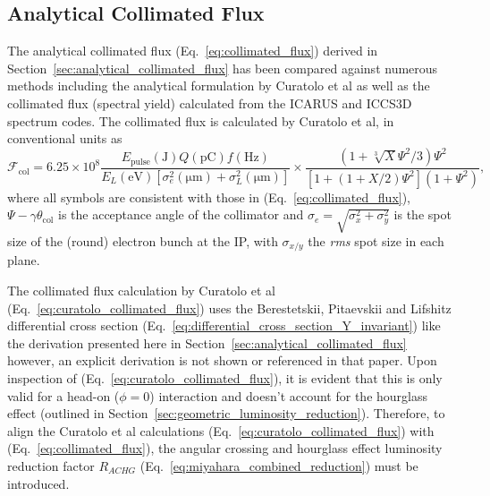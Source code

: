 \documentclass[../main.tex]{subfiles}
\begin{document}
\subsection{Analytical Collimated Flux}
\label{sec:analytical_collimated_flux_benchmarking}

The analytical collimated flux (Eq.~\ref{eq:collimated_flux}) derived in Section~\ref{sec:analytical_collimated_flux} has been compared against numerous methods including the analytical formulation by Curatolo et al \cite{curatolo2017analytical} as well as the collimated flux (spectral yield) calculated from the \textsc{ICARUS} and \textsc{ICCS3D} \cite{krafft2016laser,ranjan2018simulation} spectrum codes. The collimated flux is calculated by Curatolo et al, in conventional units as 
\begin{equation}
\mathcal{F}_{\mathrm{col}} = 6.25\times 10^{8}\frac{E_{\mathrm{pulse}}\left(\mathrm{\si{\joule}}\right)Q\left(\si{\pico\coulomb}\right)f\left(\si{\hertz}\right)}{E_{L}\left(\si{\electronvolt}\right)\left[\sigma_{e}^{2}\left(\si{\micro\meter}\right)+\sigma_{L}^{2}\left(\si{\micro\meter}\right)\right]}\times\frac{\left(1+\sqrt[3]{X}\Psi^{2}/3\right)\Psi^{2}}{\left[1+\left(1+X/2\right)\Psi^{2}\right]\left(1+\Psi^{2}\right)},
\label{eq:curatolo_collimated_flux}
\end{equation}
where all symbols are consistent with those in (Eq.~\ref{eq:collimated_flux}), $\Psi-\gamma\theta_{\mathrm{col}}$ is the acceptance angle of the collimator and $\sigma_{e} = \sqrt{\sigma_{x}^{2}+\sigma_{y}^{2}}$ is the  spot size of the (round) electron bunch at the IP, with $\sigma_{x/y}$ the \textit{rms} spot size in each plane.

The collimated flux calculation by Curatolo et al \cite{curatolo2017analytical} (Eq.~\ref{eq:curatolo_collimated_flux}) uses the Berestetskii, Pitaevskii and Lifshitz \cite{berestetskii1982quantum} differential cross section (Eq.~\ref{eq:differential_cross_section_Y_invariant}) like the derivation presented here in Section~\ref{sec:analytical_collimated_flux} however, an explicit derivation is not shown or referenced in that paper. Upon inspection of (Eq.~\ref{eq:curatolo_collimated_flux}), it is evident that this is only valid for a head-on ($\phi=0$) interaction and doesn't account for the  hourglass effect \cite{furman1991hourglass,miyahara2008luminosity} (outlined in Section~\ref{sec:geometric_luminosity_reduction}). Therefore, to align the Curatolo et al calculations (Eq.~\ref{eq:curatolo_collimated_flux}) with (Eq.~\ref{eq:collimated_flux}), the angular crossing and hourglass effect luminosity reduction factor $R_{ACHG}$ \cite{miyahara2008luminosity} (Eq.~\ref{eq:miyahara_combined_reduction}) must be introduced.
\end{document}
